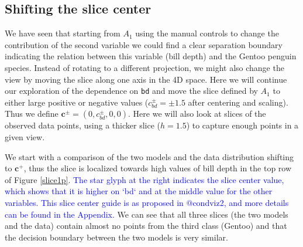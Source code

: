 \documentclass[]{interact}
\theoremstyle{plain}%
\theoremstyle{definition}
\theoremstyle{remark}
\begin{document}
\hypertarget{shifting-the-slice-center}{%
\subsection{Shifting the slice center}\label{shifting-the-slice-center}}

We have seen that starting from \(A_1\) using the manual controls to
change the contribution of the second variable we could find a clear
separation boundary indicating the relation between this variable (bill
depth) and the Gentoo penguin species. Instead of rotating to a
different projection, we might also change the view by moving the slice
along one axis in the 4D space. Here we will continue our exploration of
the dependence on \texttt{bd} and move the slice defined by \(A_1\) to
either large positive or negative values (\(c^{\pm}_{bd} = \pm 1.5\)
after centering and scaling). Thus we define
\(\mathbf{c}^{\pm} = (0, c^{\pm}_{bd}, 0, 0)\). Here we will also look
at slices of the observed data points, using a thicker slice (\(h=1.5\))
to capture enough points in a given view.

We start with a comparison of the two models and the data distribution
shifting to \(\mathbf{c}^{+}\), thus the slice is localized towards high
values of bill depth in the top row of Figure \ref{slice1p}.
\textcolor{blue}{The star glyph at the right indicates the slice center value, which shows that it is higher on `bd` and at the middle value for the other variables. This slice center guide is as proposed in @condviz2, and more details can be found in the Appendix.}
We can see that all three slices (the two models and the data) contain
almost no points from the third class (Gentoo) and that the decision
boundary between the two models is very similar.
\end{document}
